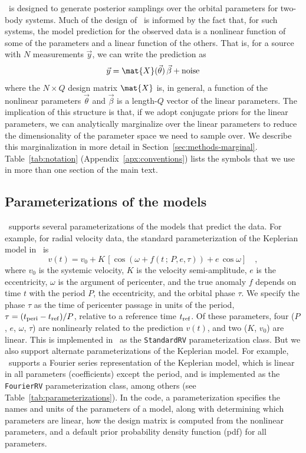 \documentclass[twocolumn]{AASTeX7/aastex701}
\newcommand{\harv}{\package{harv}}
\begin{document}
\harv\ is designed to generate posterior samplings over the orbital parameters for
two-body systems.
Much of the design of \harv\ is informed by the fact that, for such systems, the model
prediction for the observed data is a nonlinear function of some of the parameters and a
linear function of the others.
That is, for a source with $N$ measurements $\vec{y}$, we can write the prediction as
\begin{equation}
  \vec{y} = \mat{X}(\vec{\theta})\,\vec{\beta} + \mathrm{noise}
  \label{eq:linear-model}
\end{equation}
where the $N \times Q$ design matrix $\mat{X}$ is, in general, a function of the
nonlinear parameters $\vec{\theta}$ and $\vec{\beta}$ is a length-$Q$ vector of the
linear parameters.
The implication of this structure is that, if we adopt conjugate priors for the linear
parameters, we can analytically marginalize over the linear parameters to reduce the
dimensionality of the parameter space we need to sample over.
We describe this marginalization in more detail in Section~\ref{sec:methods-marginal}.
Table~\ref{tab:notation} (Appendix~\ref{apx:conventions}) lists the symbols that we use
in more than one section of the main text.

\subsection{Parameterizations of the models}
\label{sec:design-parameterizations}

\harv\ supports several parameterizations of the models that predict the data.
For example, for radial velocity data, the standard parameterization of the Keplerian
model in \harv\ is
\begin{equation}
  v(t) = v_0 + K\,[\cos(\omega + f(t \,;\, P, e, \tau)) + e\,\cos\omega]
  \quad ,
  \label{eq:rv-model}
\end{equation}
where $v_0$ is the systemic velocity, $K$ is the velocity semi-amplitude, $e$ is the
eccentricity, $\omega$ is the argument of pericenter, and the true anomaly $f$ depends
on time $t$ with the period $P$, the eccentricity, and the orbital phase $\tau$.
We specify the phase $\tau$ as the time of pericenter passage in units of the period,
$\tau = (t_{\rm peri} - t_{\rm ref}) / P$, relative to a reference time $t_{\rm ref}$.
Of these parameters, four ($P$, $e$, $\omega$, $\tau$) are nonlinearly related to the
prediction $v(t)$, and two ($K$, $v_0$) are linear.
This is implemented in \harv\ as the \texttt{StandardRV} parameterization class.
But we also support alternate parameterizations of the Keplerian model.
For example, \harv\ supports a Fourier series representation of the Keplerian model,
which is linear in all parameters (coefficients) except the period, and is implemented
as the \texttt{FourierRV} parameterization class, among others (see
Table~\ref{tab:parameterizations}).
In the code, a parameterization specifies the names and units of the parameters of a
model, along with determining which parameters are linear, how the design matrix is
computed from the nonlinear parameters, and a default prior probability density function
(pdf) for all parameters.
\end{document}
